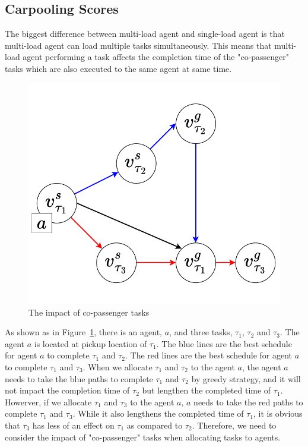 \documentclass[sigconf,anonymous]{aamas}
\begin{document}
\subsection{Carpooling Scores}
The biggest difference between multi-load agent and single-load agent 
is that multi-load agent can load multiple tasks simultaneously. 
This means that multi-load agent performing a task affects the completion time of the "co-passenger" tasks 
which are also executed to the same agent at same time.
\begin{figure}[ht]
  \centering
  \includegraphics[width=0.5\linewidth]{Fig/carpooling.pdf}
  \caption{The impact of co-passenger tasks}
  \label{fig:carpooling}
\end{figure}

\begin{example}
As shown as in Figure~\ref{fig:carpooling}, there is an agent, $a$, 
and three tasks, $\tau_{1}$, $\tau_{2}$ and $\tau_{3}$.
The agent $a$ is located at pickup location of $\tau_{1}$.
The blue lines are the best schedule for agent $a$ to complete $\tau_{1}$ and $\tau_{2}$.
The red lines are the best schedule for agent $a$ to complete $\tau_{1}$ and $\tau_{3}$.
When we allocate $\tau_{1}$ and $\tau_{2}$ to the agent $a$,
the agent $a$ needs to take the blue paths to complete $\tau_{1}$ and $\tau_{2}$ by greedy strategy,
and it will not impact the completion time of $\tau_{2}$ but lengthen the completed time of $\tau_{1}$.
Howerver, if we allocate $\tau_{1}$ and $\tau_{3}$ to the agent $a$, 
$a$ needs to take the red paths to complete $\tau_{1}$ and $\tau_{3}$.
While it also lengthens the completed time of $\tau_{1}$, 
it is obvious that $\tau_3$ has less of an effect on $\tau_1$ as compared to $\tau_{2}$.
Therefore, we need to consider the impact of "co-passenger" tasks when allocating tasks to agents.
\end{example}
\end{document}
